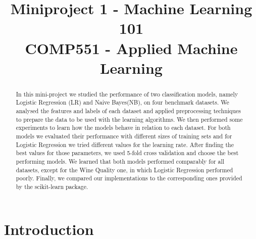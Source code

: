 \documentclass[conference]{IEEEtran}
\begin{document}
\title{Miniproject 1 - Machine Learning 101 \\
{\small COMP551 - Applied Machine Learning}
}

\author{
\and
{}
\and
{}
}

\maketitle

\begin{abstract}
 In this mini-project we studied the performance of two classification models, namely Logistic Regression (LR) and Naive Bayes(NB), on four benchmark datasets. We analysed the features and labels of each dataset and applied preprocessing techniques to prepare the data to be used with the learning algorithms. We then performed some experiments to learn how the models behave in relation to each dataset. For both models we evaluated their performance with different sizes of training sets and for Logistic Regression we tried different values for the learning rate. After finding the best values for those parameters, we used 5-fold cross validation and choose the best performing models. We learned that both models performed comparably for all datasets, except for the Wine Quality one, in which Logistic Regression performed poorly. Finally, we compared our implementations to the corresponding ones provided by the scikit-learn package.
\end{abstract}


\section{Introduction}
\end{document}

